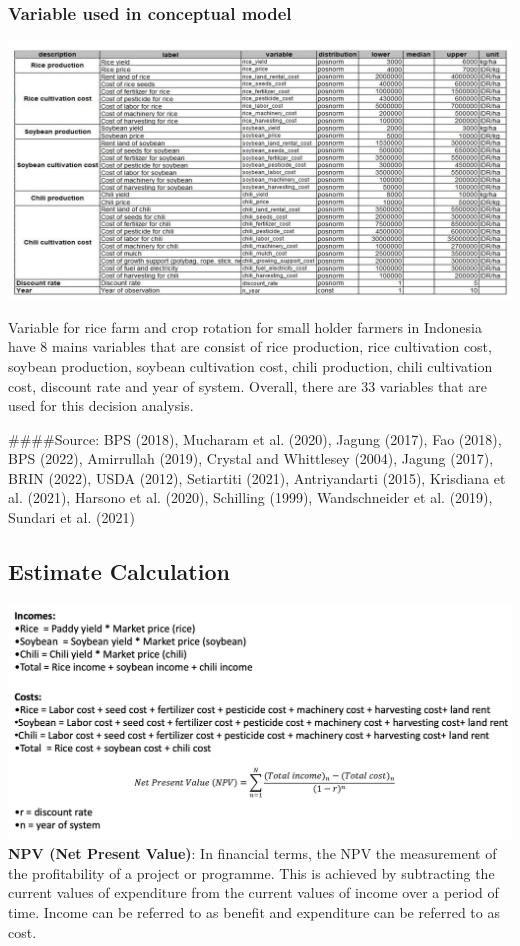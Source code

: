 \documentclass[
]{article}
\begin{document}
\hypertarget{variable-used-in-conceptual-model}{%
\subsubsection{Variable used in conceptual
model}\label{variable-used-in-conceptual-model}}

\includegraphics{Photo rice farm with crop rotation/Variable estimate.png}

Variable for rice farm and crop rotation for small holder farmers in
Indonesia have 8 mains variables that are consist of rice production,
rice cultivation cost, soybean production, soybean cultivation cost,
chili production, chili cultivation cost, discount rate and year of
system. Overall, there are 33 variables that are used for this decision
analysis.

\#\#\#\#Source: BPS (2018), Mucharam et al. (2020), Jagung (2017), Fao
(2018), BPS (2022), Amirrullah (2019), Crystal and Whittlesey (2004),
Jagung (2017), BRIN (2022), USDA (2012), Setiartiti (2021),
Antriyandarti (2015), Krisdiana et al. (2021), Harsono et al. (2020),
Schilling (1999), Wandschneider et al. (2019), Sundari et al. (2021)

\hypertarget{estimate-calculation}{%
\subsection{Estimate Calculation}\label{estimate-calculation}}

\includegraphics{Photo rice farm with crop rotation/Estimate calculation.png}
\textbf{NPV (Net Present Value)}: In financial terms, the NPV the
measurement of the profitability of a project or programme. This is
achieved by subtracting the current values of expenditure from the
current values of income over a period of time. Income can be referred
to as benefit and expenditure can be referred to as cost.
\end{document}
